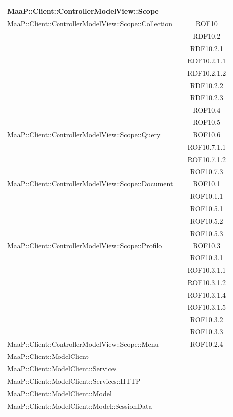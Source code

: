 \begin{center}
\begin{longtable}{|p{0.8\linewidth}|c|}
\midrule
MaaP::Client::ControllerModelView::Scope
& \\

\midrule
MaaP::Client::ControllerModelView::Scope::Collection
& ROF10\\
& RDF10.2\\
& RDF10.2.1\\
& RDF10.2.1.1\\
& RDF10.2.1.2\\
& RDF10.2.2\\
& RDF10.2.3\\
& ROF10.4\\
& ROF10.5\\

\midrule
MaaP::Client::ControllerModelView::Scope::Query
& ROF10.6\\
& ROF10.7.1.1\\
& ROF10.7.1.2\\
& ROF10.7.3\\

\midrule
MaaP::Client::ControllerModelView::Scope::Document
& ROF10.1\\
& ROF10.1.1\\
& ROF10.5.1\\
& ROF10.5.2\\
& ROF10.5.3\\


\midrule
MaaP::Client::ControllerModelView::Scope::Profilo
& ROF10.3\\
& ROF10.3.1\\
& ROF10.3.1.1\\
& ROF10.3.1.2\\
& ROF10.3.1.4\\
& ROF10.3.1.5\\
& ROF10.3.2\\
& ROF10.3.3\\


\midrule
MaaP::Client::ControllerModelView::Scope::Menu
& ROF10.2.4\\

\midrule
MaaP::Client::ModelClient
& \\

\midrule
MaaP::Client::ModelClient::Services
& \\

\midrule
MaaP::Client::ModelClient::Services::HTTP
& \\

\midrule
MaaP::Client::ModelClient::Model
& \\

\midrule
MaaP::Client::ModelClient::Model::SessionData
& \\

\end{longtable}
\end{center}

